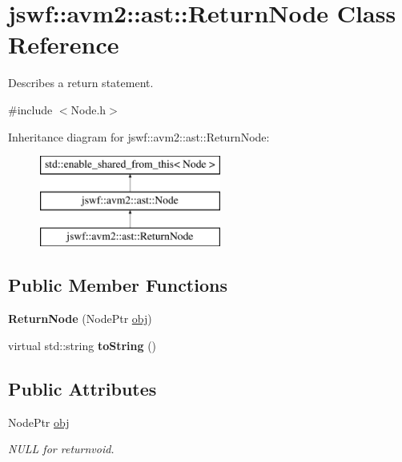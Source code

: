 \hypertarget{classjswf_1_1avm2_1_1ast_1_1_return_node}{\section{jswf\+:\+:avm2\+:\+:ast\+:\+:Return\+Node Class Reference}
\label{classjswf_1_1avm2_1_1ast_1_1_return_node}
}


Describes a return statement.  




{\ttfamily \#include $<$Node.\+h$>$}

Inheritance diagram for jswf\+:\+:avm2\+:\+:ast\+:\+:Return\+Node\+:\begin{figure}[H]
\begin{center}
\leavevmode
\includegraphics[height=3.000000cm]{classjswf_1_1avm2_1_1ast_1_1_return_node}
\end{center}
\end{figure}
\subsection*{Public Member Functions}
\begin{DoxyCompactItemize}
\item 
\hypertarget{classjswf_1_1avm2_1_1ast_1_1_return_node_ad809b4eff553757a17dbe3b83823753b}{{\bfseries Return\+Node} (Node\+Ptr \hyperlink{classjswf_1_1avm2_1_1ast_1_1_return_node_a028bd599479c227481aa658992dc5fd7}{obj})}\label{classjswf_1_1avm2_1_1ast_1_1_return_node_ad809b4eff553757a17dbe3b83823753b}

\item 
\hypertarget{classjswf_1_1avm2_1_1ast_1_1_return_node_a5bdfbefe5db8f6f1ebf4f9ac3e1dc575}{virtual std\+::string {\bfseries to\+String} ()}\label{classjswf_1_1avm2_1_1ast_1_1_return_node_a5bdfbefe5db8f6f1ebf4f9ac3e1dc575}

\end{DoxyCompactItemize}
\subsection*{Public Attributes}
\begin{DoxyCompactItemize}
\item 
\hypertarget{classjswf_1_1avm2_1_1ast_1_1_return_node_a028bd599479c227481aa658992dc5fd7}{Node\+Ptr \hyperlink{classjswf_1_1avm2_1_1ast_1_1_return_node_a028bd599479c227481aa658992dc5fd7}{obj}}\label{classjswf_1_1avm2_1_1ast_1_1_return_node_a028bd599479c227481aa658992dc5fd7}

\begin{DoxyCompactList}\small\item\em N\+U\+L\+L for returnvoid. \end{DoxyCompactList}\end{DoxyCompactItemize}


